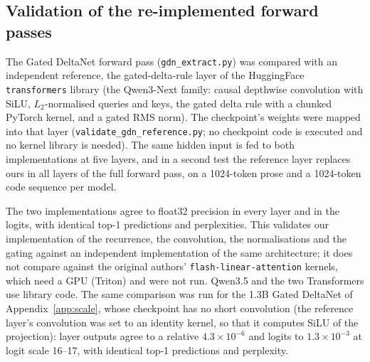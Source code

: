 \subsection{Validation of the re-implemented forward passes}\label{sec:val}
The Gated DeltaNet forward pass (\texttt{gdn\_extract.py}) was compared with an independent reference, the gated-delta-rule layer of the HuggingFace \texttt{transformers} library (the Qwen3-Next family: causal depthwise convolution with SiLU, $L_2$-normalised queries and keys, the gated delta rule with a chunked PyTorch kernel, and a gated RMS norm). The checkpoint's weights were mapped into that layer (\texttt{validate\_gdn\_reference.py}; no checkpoint code is executed and no kernel library is needed). The same hidden input is fed to both implementations at five layers, and in a second test the reference layer replaces ours in all layers of the full forward pass, on a 1024-token prose and a 1024-token code sequence per model.
\begin{table}[!htbp]
  \caption{Re-implementations against their references, float32. Gated DeltaNet: the \texttt{transformers} reference layer, 1024-token sequences; ``Layer'' is the largest relative output difference over the five checked layers, and the logit columns are for the full model with every attention layer replaced by the reference. RWKV-7: the NumPy reference in the authors' repository, run unmodified on the converted checkpoint, 512-token sequences; it exposes only the final logits.}\label{tab:validation}
  \centering\scriptsize\setlength{\tabcolsep}{3pt}
  
\end{table}
The two implementations agree to float32 precision in every layer and in the logits, with identical top-1 predictions and perplexities. This validates our implementation of the recurrence, the convolution, the normalisations and the gating against an independent implementation of the same architecture; it does not compare against the original authors' \texttt{flash-linear-attention} kernels, which need a GPU (Triton) and were not run. Qwen3.5 and the two Transformers use library code. The same comparison was run for the 1.3B Gated DeltaNet of Appendix~\ref{app:scale}, whose checkpoint has no short convolution (the reference layer's convolution was set to an identity kernel, so that it computes SiLU of the projection): layer outputs agree to a relative $4.3\times10^{-6}$ and logits to $1.3\times10^{-3}$ at logit scale 16--17, with identical top-1 predictions and perplexity.


